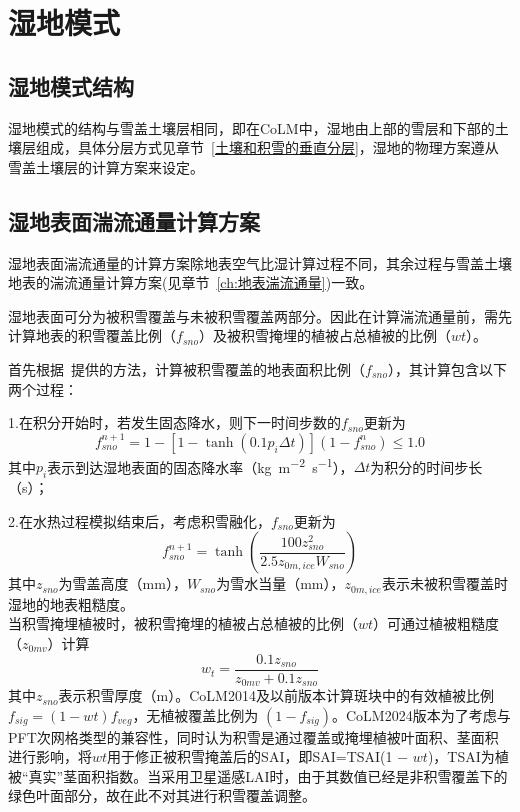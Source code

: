 \chapter{湿地模式}

\section{湿地模式结构}
湿地模式的结构与雪盖土壤层相同，即在CoLM中，湿地由上部的雪层和下部的土壤层组成，具体分层方式见章节~\ref{土壤和积雪的垂直分层}，湿地的物理方案遵从雪盖土壤层的计算方案来设定。

\section{湿地表面湍流通量计算方案}
湿地表面湍流通量的计算方案除地表空气比湿计算过程不同，其余过程与雪盖土壤地表的湍流通量计算方案(见章节~\ref{ch:地表湍流通量})一致。

湿地表面可分为被积雪覆盖与未被积雪覆盖两部分。因此在计算湍流通量前，需先计算地表的积雪覆盖比例（$f_{sno}$）及被积雪掩埋的植被占总植被的比例（$wt$）。

首先根据~\citet{swenson2012new}提供的方法，计算被积雪覆盖的地表面积比例（$f_{sno}$），其计算包含以下两个过程：

1.在积分开始时，若发生固态降水，则下一时间步数的$f_{sno}$更新为
\begin{equation}
    f^{n+1}_{sno}=1-\left[1-\tanh{\left(0.1 p_i \Delta t\right)}\right]\left(1-f^n_{sno}\right) \leqslant 1.0
\end{equation}
其中$p_i$表示到达湿地表面的固态降水率（\unit{kg.m^{-2}.s^{-1}}），$\Delta t$为积分的时间步长（s）；

2.在水热过程模拟结束后，考虑积雪融化，$f_{sno}$更新为
\begin{equation}
    f^{n+1}_{sno}=\tanh \left(\frac{100 z^2_{sno}}{2.5z_{0m,ice} W_{sno}}\right)
\end{equation}
其中$z_{sno}$为雪盖高度（mm），$W_{sno}$为雪水当量（mm），$z_{0m,ice}$表示未被积雪覆盖时湿地的地表粗糙度。\\

当积雪掩埋植被时，被积雪掩埋的植被占总植被的比例（$wt$）可通过植被粗糙度（$z_{0mv}$）计算
\begin{equation}
    w_t=\frac{0.1 z_{sno}}{z_{0mv}+0.1 z_{sno}}
\end{equation}
其中$z_{sno}$表示积雪厚度（m）。CoLM2014及以前版本计算斑块中的有效植被比例$f_{sig} =
 (1 −wt)f_{veg}$，无植被覆盖比例为 $(1−f_{sig})$。CoLM2024版本为了考虑与PFT次网格类型的兼容性，同时认为积雪是通过覆盖或掩埋植被叶面积、茎面积进行影响，将$wt$用于修正被积雪掩盖后的SAI，即SAI=TSAI(1 − $wt$)，TSAI为植被“真实”茎面积指数。当采用卫星遥感LAI时，由于其数值已经是非积雪覆盖下的绿色叶面部分，故在此不对其进行积雪覆盖调整。\\

